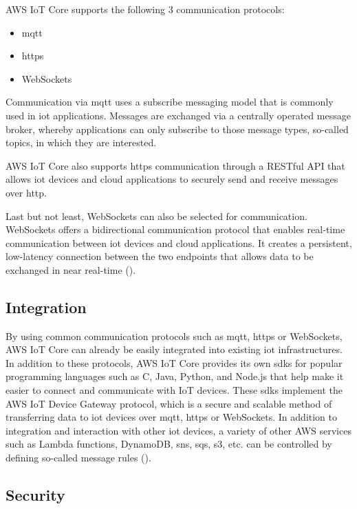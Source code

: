 AWS IoT Core supports the following 3 communication protocols:

\begin{itemize}
    \item \ac{mqtt}
    \item \ac{https}
    \item WebSockets
\end{itemize}
Communication via \ac{mqtt} uses a subscribe messaging model that is commonly used in \ac{iot} applications. 
Messages are exchanged via a centrally operated message broker, whereby applications can only subscribe to those message types, so-called topics, in which they are interested.

AWS IoT Core also supports \ac{https} communication through a RESTful API that allows \ac{iot} devices and cloud applications to securely send and receive messages over \ac{http}.

Last but not least, WebSockets can also be selected for communication. WebSockets offers a bidirectional communication protocol that enables real-time communication between \ac{iot} devices and cloud applications. 
It creates a persistent, low-latency connection between the two endpoints that allows data to be exchanged in near real-time ({\cite{ref02}}).

\subsection{Integration}

By using common communication protocols such as \ac{mqtt}, \ac{https} or WebSockets, AWS IoT Core can already be easily integrated into existing \ac{iot} infrastructures. 
In addition to these protocols, AWS IoT Core provides its own \ac{sdk}s for popular programming languages such as C, Java, Python, and Node.js that help make it easier to connect and communicate with IoT devices. 
These \ac{sdk}s implement the AWS IoT Device Gateway protocol, which is a secure and scalable method of transferring data to \ac{iot} devices over \ac{mqtt}, \ac{https} or WebSockets.
In addition to integration and interaction with other \ac{iot} devices, a variety of other AWS services such as Lambda functions, DynamoDB, \ac{sns}, \ac{sqs}, \ac{s3}, etc. can be controlled by defining so-called message rules (\cite{RefAwsIotCoreFeatures}).

\subsection{Security}

